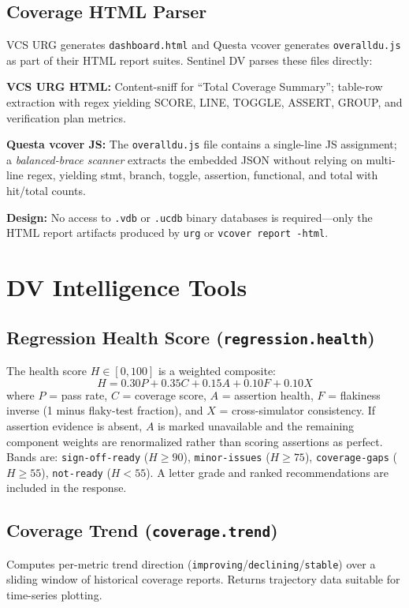 \documentclass[10pt,twocolumn]{article}
\begin{document}
\subsection{Coverage HTML Parser}
\label{sec:coverage}
VCS URG generates \texttt{dashboard.html} and Questa vcover generates
\texttt{overalldu.js} as part of their HTML report suites. Sentinel DV
parses these files directly:

\noindent\textbf{VCS URG HTML:} Content-sniff for ``Total Coverage Summary'';
table-row extraction with regex yielding SCORE, LINE, TOGGLE, ASSERT,
GROUP, and verification plan metrics.

\noindent\textbf{Questa vcover JS:} The \texttt{overalldu.js} file contains a
single-line JS assignment; a \emph{balanced-brace scanner} extracts the embedded
JSON without relying on multi-line regex, yielding stmt, branch, toggle,
assertion, functional, and total with hit/total counts.

\noindent\textbf{Design:} No access to \texttt{.vdb} or \texttt{.ucdb} binary
databases is required---only the HTML report artifacts produced by
\texttt{urg} or \texttt{vcover report -html}.

\section{DV Intelligence Tools}
\label{sec:intelligence}

\subsection{Regression Health Score (\texttt{regression.health})}
The health score $H \in [0, 100]$ is a weighted composite:
\[
H = 0.30 P + 0.35 C + 0.15 A + 0.10 F + 0.10 X
\]
where $P$ = pass rate, $C$ = coverage score, $A$ = assertion health,
$F$ = flakiness inverse (1 minus flaky-test fraction), and $X$ =
cross-simulator consistency. If assertion evidence is absent, $A$ is marked
unavailable and the remaining component weights are renormalized rather than
scoring assertions as perfect. Bands are: \texttt{sign-off-ready} ($H\geq90$),
\texttt{minor-issues} ($H\geq75$), \texttt{coverage-gaps} ($H\geq55$),
\texttt{not-ready} ($H<55$). A letter grade and ranked recommendations are
included in the response.

\subsection{Coverage Trend (\texttt{coverage.trend})}
Computes per-metric trend direction (\texttt{improving}/\texttt{declining}/\texttt{stable})
over a sliding window of historical coverage reports. Returns trajectory data
suitable for time-series plotting.
\end{document}
